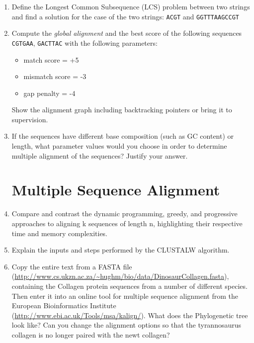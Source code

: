 \documentclass[11pt,runningheads,a4paper]{article}
\newcommand{\DNA}[1]{\texttt{\uppercase{#1}}}
\begin{document}
\begin{enumerate}
	\item Define the Longest Common Subsequence (LCS) problem between two strings and find a solution for the case of the two strings: \DNA{ACGT} and \DNA{GGTTTAAGCCGT}

	\item Compute the \textit{global alignment} and the best score of the following sequences \DNA{CGTGAA}, \DNA{GACTTAC} with the following parameters:
\begin{itemize}
  \item match score = +5
  \item mismatch score = -3
  \item gap penalty = -4
\end{itemize}
Show the alignment graph including backtracking pointers or bring it to supervision.

	\item If the sequences have different base composition (such as GC content) or length, what parameter values would you choose in order to determine multiple alignment of the sequences?  Justify your answer.

\section*{Multiple Sequence Alignment}

\item Compare and contrast the dynamic programming, greedy, and progressive
approaches to aligning k sequences of length n, highlighting their respective time and memory complexities.
\item Explain the inputs and steps performed by the CLUSTALW algorithm.
  
\item Copy the entire text from a FASTA file (\url{http://www.cs.ukzn.ac.za/~hughm/bio/data/DinosaurCollagen.fasta}), containing the Collagen protein sequences from a number of different species. Then enter it into an online tool for multiple sequence alignment from the European Bioinformatics Institute (\url{http://www.ebi.ac.uk/Tools/msa/kalign/}). What does the Phylogenetic tree look like? Can you change the alignment options so that the tyrannosaurus collagen is no longer paired with the newt collagen?


\end{enumerate}
\end{document}
